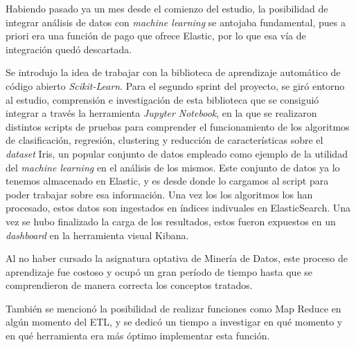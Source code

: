 Habiendo pasado ya un mes desde el comienzo del estudio, la posibilidad de integrar análisis de datos con \textit{machine learning} se antojaba fundamental, pues a priori era una función de pago que ofrece Elastic, por lo que esa vía de integración quedó descartada.

Se introdujo la idea de trabajar con la biblioteca de aprendizaje automático de código abierto \textit{Scikit-Learn}. Para el segundo sprint del proyecto, se giró entorno al estudio, comprensión e investigación de esta biblioteca que se consiguió integrar a través la herramienta \textit{Jupyter Notebook}, en la que se realizaron distintos scripts de pruebas para comprender el funcionamiento de los algoritmos de clasificación, regresión, clustering y reducción de características sobre el \textit{dataset} Iris, un popular conjunto de datos empleado como ejemplo de la utilidad del \textit{machine learning} en el análisis de los mismos. Este conjunto de datos ya lo tenemos almacenado en Elastic, y es desde donde lo cargamos al script para poder trabajar sobre esa información. Una vez los los algoritmos los han procesado, estos datos son ingestados en índices indivuales en ElasticSearch. Una vez se hubo finalizado la carga de los resultados, estos fueron expuestos en un \textit{dashboard} en la herramienta visual Kibana. 

Al no haber cursado la asignatura optativa de Minería de Datos, este proceso de aprendizaje fue costoso y ocupó un gran período de tiempo hasta que se comprendieron de manera correcta los conceptos tratados.

También se mencionó la posibilidad de realizar funciones como Map Reduce en algún momento del ETL, y se dedicó un tiempo a investigar en qué momento y en qué herramienta era más óptimo implementar esta función. 

\paragraph{}
\paragraph{}
\paragraph{}
\paragraph{}
\paragraph{}

